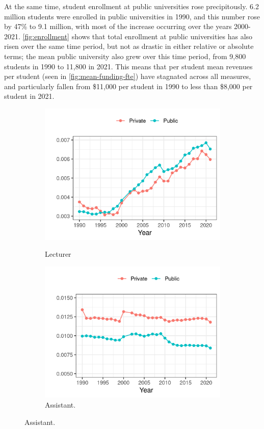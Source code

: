 \documentclass[notitlepage,12pt]{article}
\begin{document}
At the same time, student enrollment at public universities rose precipitously.
6.2 million students were enrolled in public universities in 1990, and this number rose by 47\% to 9.1 million, with most of the increase occurring over the years 2000-2021.
\autoref{fig:enrollment} shows that total enrollment at public universities has also risen over the same time period, but not as drastic in either relative or absolute terms; the mean public university also grew over this time period, from 9,800 students in 1990 to 11,800 in 2021.
This means that per student mean revenues per student (seen in \autoref{fig:mean-funding-fte}) have stagnated across all measures, and particularly fallen from \$11,000 per student in 1990 to less than \$8,000 per student in 2021.
\begin{figure}[!h]
    \centering
    \singlespacing
    \caption{Total Professor Count per Student, by University Sector, Professor Appointment, and Year.}
    \begin{subfigure}[b]{0.495\textwidth}
        \centering
        \caption{Lecturer}
        \includegraphics[width=\textwidth]{figures/lecturer-fte-perprof.png}
        \label{fig:lecturer-fte-perprof}
    \end{subfigure}
    \begin{subfigure}[b]{0.495\textwidth}
        \centering
        \caption{Assistant.}
        \includegraphics[width=\textwidth]{figures/assistant-fte-perprof.png}

\end{subfigure}
\end{figure}
\end{document}

